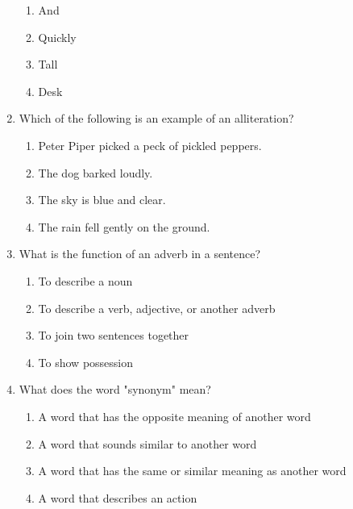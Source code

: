 \documentclass[12pt]{article}
\begin{document}
\begin{enumerate}
    \begin{enumerate}[label=\Alph*.]
        \item And
        \item Quickly
        \item Tall
        \item Desk
    \end{enumerate}

    \vspace{0.5cm}

    \item Which of the following is an example of an alliteration?

    \begin{enumerate}[label=\Alph*.]
        \item Peter Piper picked a peck of pickled peppers.
        \item The dog barked loudly.
        \item The sky is blue and clear.
        \item The rain fell gently on the ground.
    \end{enumerate}

    \vspace{0.5cm}

    \item What is the function of an adverb in a sentence?

    \begin{enumerate}[label=\Alph*.]
        \item To describe a noun
        \item To describe a verb, adjective, or another adverb
        \item To join two sentences together
        \item To show possession
    \end{enumerate}

    \vspace{0.5cm}

    \item What does the word "synonym" mean?

    \begin{enumerate}[label=\Alph*.]
        \item A word that has the opposite meaning of another word
        \item A word that sounds similar to another word
        \item A word that has the same or similar meaning as another word
        \item A word that describes an action
    \end{enumerate}


\end{enumerate}
\end{document}
